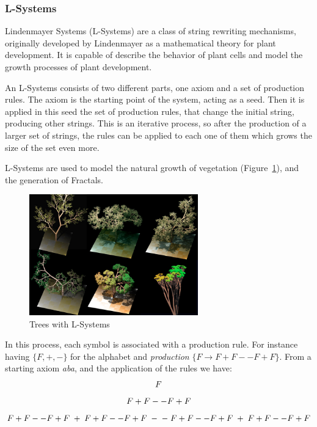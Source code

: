 
\subsubsection{L-Systems} %
\label{ssub:l_systems}

Lindenmayer Systems (L-Systems) are a class of string rewriting mechanisms, originally developed by Lindenmayer as a mathematical theory for plant
development. It is capable of describe the behavior of plant cells and model the growth processes of plant development.

An L-Systems consists of two different parts, one axiom and a set of production rules. The axiom is the starting point of the system, acting as a seed. Then it is applied in this seed the set of production rules, that change the initial string, producing other strings.
This is an iterative process, so after the production of a larger set of strings, the rules can be applied to each one of them which grows the size of
the set even more.

L-Systems are used to model the natural growth of vegetation (Figure~\ref{fig:trees}), and the generation of Fractals. 

\begin{figure}[htbp]
    \centering
    \includegraphics[width=0.65\textwidth]{img/Theory/L_Systems/Dragon_trees.jpg}
    \caption{Trees with L-Systems}
    \label{fig:trees}
\end{figure}


In this process, each symbol is associated with a production rule. For instance having $\{F, +, -\}$ for the alphabet and \emph{production} $\{F \rightarrow
 F+F--F+F\}$. From a starting axiom \emph{aba}, and the application of the rules we have:\\
\begin{equation} \label{eq:seed}
F\\
\end{equation}
\begin{equation} \label{eq:step1}
F+F--F+F\\
\end{equation}
\begin{equation} \label{eq:step2}
F+F--F+F \; + \; F+F--F+F \;- \;- \;F+F--F+F \;+ \;F+F--F+F\\
\end{equation}

